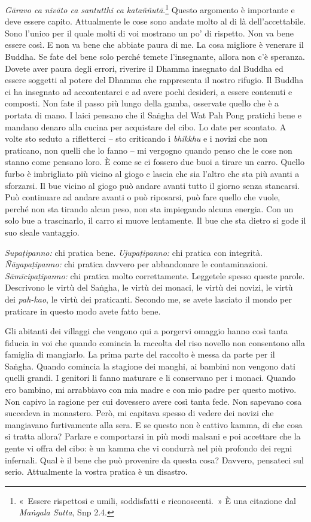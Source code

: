 \emph{Gāravo ca nivāto ca santutthi ca kataññutā}.\footnote{«~Essere
  rispettosi e umili, soddisfatti e riconoscenti.~» È una citazione dal
  \emph{Maṅgala Sutta}, Snp 2.4.} Questo argomento è importante e
deve essere capito. Attualmente le cose sono andate molto al di là
dell'accettabile. Sono l'unico per il quale molti di voi mostrano un po'
di rispetto. Non va bene essere così. E non va bene che abbiate paura di
me. La cosa migliore è venerare il Buddha. Se fate del bene solo perché
temete l'insegnante, allora non c'è speranza. Dovete aver paura degli
errori, riverire il Dhamma insegnato dal Buddha ed essere soggetti al
potere del Dhamma che rappresenta il nostro rifugio. Il Buddha ci ha
insegnato ad accontentarci e ad avere pochi desideri, a essere contenuti
e composti. Non fate il passo più lungo della gamba, osservate quello
che è a portata di mano. I laici pensano che il Saṅgha del Wat Pah Pong
pratichi bene e mandano denaro alla cucina per acquistare del cibo. Lo
date per scontato. A volte sto seduto a rifletterci -- sto criticando i
\emph{bhikkhu} e i novizi che non praticano, non quelli che lo fanno --
mi vergogno quando penso che le cose non stanno come pensano loro. È
come se ci fossero due buoi a tirare un carro. Quello furbo è
imbrigliato più vicino al giogo e lascia che sia l'altro che sta più
avanti a sforzarsi. Il bue vicino al giogo può andare avanti tutto il
giorno senza stancarsi. Può continuare ad andare avanti o può riposarsi,
può fare quello che vuole, perché non sta tirando alcun peso, non sta
impiegando alcuna energia. Con un solo bue a trascinarlo, il carro si
muove lentamente. Il bue che sta dietro si gode il suo sleale vantaggio.

\emph{Supaṭipanno:} chi pratica bene. \emph{Ujupaṭipanno:} chi pratica
con integrità. \emph{Ñāyapaṭipanno:} chi pratica davvero per abbandonare
le contaminazioni. \emph{Sāmīcipaṭipanno:} chi pratica molto
correttamente. Leggetele spesso queste parole. Descrivono le virtù del
Saṅgha, le virtù dei monaci, le virtù dei novizi, le virtù dei
\emph{pah-kao}, le virtù dei praticanti. Secondo me, se avete lasciato
il mondo per praticare in questo modo avete fatto bene.

Gli abitanti dei villaggi che vengono qui a porgervi omaggio hanno così
tanta fiducia in voi che quando comincia la raccolta del riso novello
non consentono alla famiglia di mangiarlo. La prima parte del raccolto è
messa da parte per il Saṅgha. Quando comincia la stagione dei manghi, ai
bambini non vengono dati quelli grandi. I genitori li fanno maturare e
li conservano per i monaci. Quando ero bambino, mi arrabbiavo con mia
madre e con mio padre per questo motivo. Non capivo la ragione per cui
dovessero avere così tanta fede. Non sapevano cosa succedeva in
monastero. Però, mi capitava spesso di vedere dei novizi che mangiavano
furtivamente alla sera. E se questo non è cattivo kamma, di che
cosa si tratta allora? Parlare e comportarsi in più modi malsani e poi
accettare che la gente vi offra del cibo: è un kamma che vi
condurrà nel più profondo dei regni infernali. Qual è il bene che può
provenire da questa cosa? Davvero, pensateci sul serio. Attualmente la
vostra pratica è un disastro.

